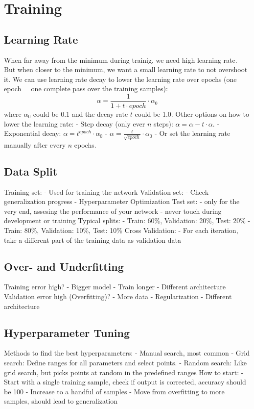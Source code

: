 \documentclass{scrartcl}
\begin{document}
\section*{Training}
\subsection*{Learning Rate}
When far away from the minimum during trainig, we need high learning rate. But when closer to the minimum, we want a small learning rate to not overshoot it.
We can use learning rate decay to lower the learning rate over epochs (one epoch = one complete pass over the training samples):
$$\alpha = \frac{1}{1 + t \cdot epoch} \cdot \alpha_0$$
where $\alpha_0$ could be 0.1 and the decay rate $t$ could be 1.0.
Other options on how to lower the learning rate:
- Step decay (only ever $n$ steps): $\alpha = \alpha - t \cdot \alpha$.
- Exponential decay: $\alpha = t^{epoch} \cdot \alpha_0$
- $\alpha = \frac{t}{\sqrt{epoch}} \cdot \alpha_0$
- Or set the learning rate manually after every $n$ epochs.

\subsection*{Data Split}
Training set:
- Used for training the network
Validation set:
- Check generalization progress
- Hyperparameter Optimization
Test set:
- only for the very end, assesing the performance of your network
- never touch during development or training
Typical splits:
- Train: 60\%, Validation: 20\%, Test: 20\%
- Train: 80\%, Validation: 10\%, Test: 10\%
Cross Validation:
- For each iteration, take a different part of the training data as validation data

\subsection*{Over- and Underfitting}
Training error high?
- Bigger model
- Train longer
- Different architecture
Validation error high (Overfitting)?
- More data
- Regularization
- Different architecture

\subsection*{Hyperparameter Tuning}
Methods to find the best hyperparameters:
- Manual search, most common
- Grid search: Define ranges for all parameters and select points.
- Random search: Like grid search, but picks points at random in the predefined ranges
How to start:
- Start with a single training sample, check if output is corrected, accuracy should be 100%
- Increase to a handful of samples
- Move from overfitting to more samples, should lead to generalization
\end{document}
